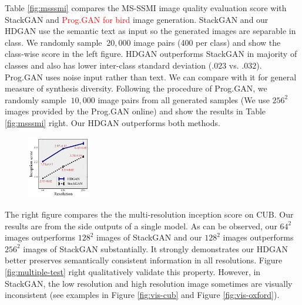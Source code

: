 \documentclass[10pt,twocolumn,letterpaper]{article}
\begin{document}
Table \ref{fig:msssmi} compares the MS-SSMI image quality evaluation score with StackGAN and \textcolor{red}{Prog.GAN for bird} image generation. StackGAN and our HDGAN use the semantic text as input so the generated images are separable in class. We randomly sample ${~}20,000$ image pairs (400 per class) and show the class-wise score in the left figure. HDGAN outperforms StackGAN in majority of classes and also has lower inter-class standard deviation ($.023$ vs. $.032$).
Prog.GAN uses noise input rather than text. We can compare with it for general measure of synthesis diversity. Following the procedure of Prog.GAN, we randomly sample ${~}10,000$ image pairs from all generated samples (We use $256^2$ images provided by the Prog.GAN online) and show the results in Table \ref{fig:msssmi} right. Our HDGAN outperforms both methods. 


\begingroup
\setlength{\intextsep}{-4pt}%
\setlength{\columnsep}{0pt}%
\begin{figure}
	\centering
	\includegraphics[width=0.245\textwidth]{figure/multiscale_inception_2.pdf}
	\vspace{-12pt}
\end{figure}
The right figure compares the the multi-resolution inception score on CUB. Our results are from the side outputs of a single model. As can be observed, our $64^2$ images outperforms $128^2$ images of StackGAN and our $128^2$ images outperforms $256^2$ images of StackGAN substantially. It strongly demonstrates our HDGAN better preserves semantically consistent information in all resolutions. Figure \ref{fig:multiple-test}  right qualitatively validate this property. However, in StackGAN, the low resolution and high resolution image sometimes are visually inconsistent (see examples in Figure \ref{fig:vis-cub} and Figure \ref{fig:vis-oxford}).
\end{document}
